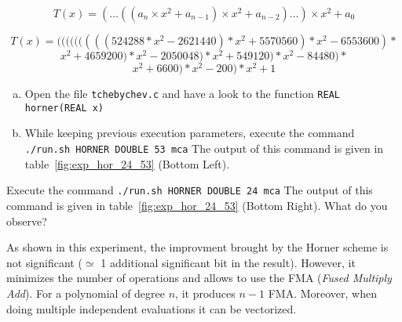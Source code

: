 \[
	T(x) = (\dots((a_n\times x^2 + a_{n-1})\times x^2 + a_{n-2})\dots) \times x^2
    + a_0
\]

$$T(x) = (((((((((524288*x^2-2621440)*x^2+5570560)*x^2-6553600)*$$
$$x^2+4659200)*x^2-2050048)*x^2+549120)*x^2-84480)*$$
$$x^2+6600)*x^2-200)*x^2+1$$

\begin{question}
  \begin{enumerate}[(a)]
  \item Open the file {\tt tchebychev.c} and have a look to the function {\tt REAL horner(REAL x)}
\item While keeping previous execution parameters, execute the command {\tt ./run.sh HORNER DOUBLE 53 mca}  \newline The output of this command is given in table~\ref{fig:exp_hor_24_53} (Bottom Left).
  \end{enumerate}
\end{question}

\begin{question}
\item Execute the command {\tt ./run.sh HORNER DOUBLE 24 mca}  \newline
The output of this command is given in table~\ref{fig:exp_hor_24_53} (Bottom Right).
What do you observe?
\end{question}

As shown in this experiment, the improvment brought by the Horner scheme is not significant ($\simeq$ 1 additional significant bit in the result). 
 However, it minimizes the
number of operations and allows to use the FMA ({\it Fused Multiply Add}). For
a polynomial of degree $n$, it produces $n-1$ FMA. Moreover, when doing
multiple independent evaluations it can be vectorized.

